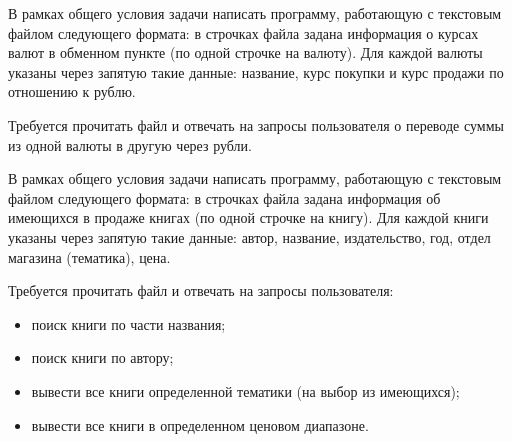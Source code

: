 
\begin{zztask}
В рамках общего условия задачи написать программу, работающую с текстовым файлом
следующего формата: в строчках файла задана информация 
о курсах валют в обменном пункте (по одной строчке на валюту).
Для каждой валюты указаны через запятую такие данные: название, курс покупки и курс продажи
по отношению к рублю.

Требуется прочитать файл и отвечать на запросы пользователя о переводе суммы из одной
валюты в другую через рубли.
\end{zztask}


\begin{zztask}
В рамках общего условия задачи написать программу, работающую с текстовым файлом
следующего формата: в строчках файла задана информация
об имеющихся в продаже книгах (по одной строчке на книгу).
Для каждой книги указаны через запятую такие данные: автор, название, издательство, год,
отдел магазина (тематика), цена.

Требуется прочитать файл и отвечать на запросы пользователя:
%
\begin{itemize}
\item поиск книги по части названия;
\item поиск книги по автору;
\item вывести все книги определенной тематики (на выбор из имеющихся);
\item вывести все книги в определенном ценовом диапазоне.
\end{itemize}
\end{zztask}


